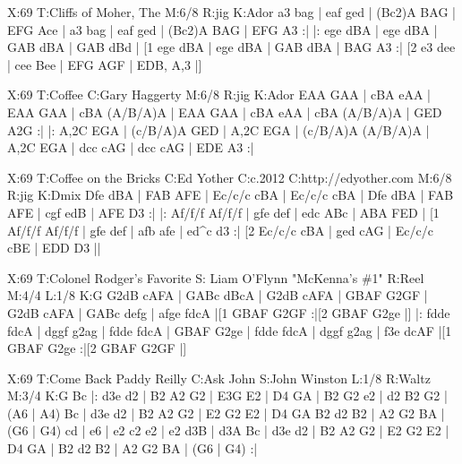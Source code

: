 \documentclass{article}
\begin{document}
\begin{abc}[name]
X:69
T:Cliffs of Moher, The
M:6/8
R:jig
K:Ador
a3 bag | eaf ged | ({B}c2)A BAG | EFG Ace |
a3 bag | eaf ged | ({B}c2)A BAG | EFG A3 :|
|: ege dBA | ege dBA | GAB dBA | GAB dBd |
[1 ege dBA | ege dBA | GAB dBA | BAG A3 :|
[2 e3 dee | cee Bee | EFG AGF | EDB, A,3 |]
\end{abc}

\begin{abc}[name]
X:69
T:Coffee
C:Gary Haggerty
M:6/8
R:jig
K:Ador
EAA GAA | cBA eAA | EAA GAA | cBA (A/B/A)A |
EAA GAA | cBA eAA | cBA (A/B/A)A | GED A2G :|
|: A,2C EGA | (c/B/A)A GED | A,2C EGA | (c/B/A)A (A/B/A)A |
A,2C EGA | dcc cAG | dcc cAG | EDE A3 :|
\end{abc}

\begin{abc}[name]
X:69
T:Coffee on the Bricks
C:Ed Yother
C:c.2012
C:http://edyother.com
M:6/8
R:jig
K:Dmix
Dfe dBA | FAB AFE | Ec/c/c cBA | Ec/c/c cBA |
Dfe dBA | FAB AFE | cgf edB | AFE D3 :|
|: Af/f/f Af/f/f | gfe def | edc ABc | ABA FED |
[1 Af/f/f Af/f/f | gfe def | afb afe | ed^c d3 :|
[2 Ec/c/c cBA | ged cAG | Ec/c/c cBE | EDD D3 ||
\end{abc}

\begin{abc}[name]
X:69
T:Colonel Rodger's Favorite
S: Liam O'Flynn "McKenna's \#1"
R:Reel
M:4/4
L:1/8
K:G
G2dB cAFA | GABc dBcA | G2dB cAFA | GBAF G2GF |
G2dB cAFA | GABc defg | afge fdcA |[1 GBAF G2GF :|[2 GBAF G2ge |]
|: fdde fdcA | dggf g2ag | fdde fdcA | GBAF G2ge |
fdde fdcA | dggf g2ag | f3e dcAF |[1 GBAF G2ge :|[2 GBAF G2GF |]
\end{abc}

\begin{abc}[name]
X:69
T:Come Back Paddy Reilly
C:Ask John
S:John Winston
L:1/8
R:Waltz
M:3/4
K:G
Bc |: d3e d2 | B2 A2 G2 | E3G E2 | D4 GA |
B2 G2 e2 | d2 B2 G2 | (A6 | A4) Bc |
d3e d2 | B2 A2 G2 | E2 G2 E2 | D4 GA
B2 d2 B2 | A2 G2 BA | (G6 | G4) cd |
e6 | e2 c2 e2 | e2 d3B | d3A Bc |
d3e d2 | B2 A2 G2 | E2 G2 E2 | D4 GA |
B2 d2 B2 | A2 G2 BA | (G6 | G4) :|
\end{abc}
\end{document}

